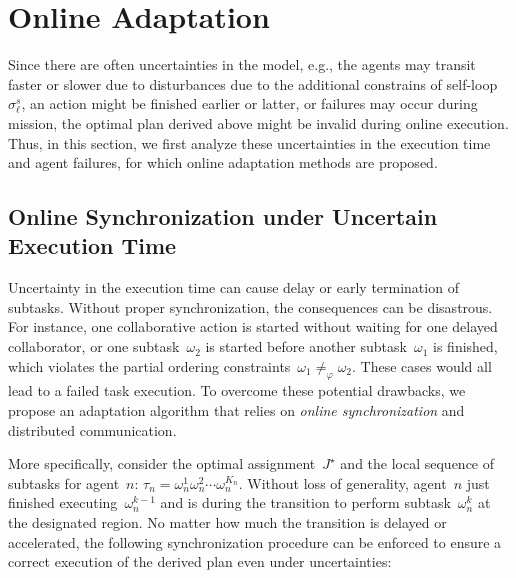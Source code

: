\section{Online Adaptation}
\label{subsec:online-adaptation}

Since there are often uncertainties in the model, e.g., the agents may
transit faster or slower due to disturbances due to the additional constrains of self-loop $\sigma^s_\ell$,
an action might be finished earlier or latter,
or failures may occur during mission,
the optimal plan derived above might be invalid during online execution.
Thus, in this section, we first analyze these uncertainties in the execution time
and agent failures, for which online adaptation methods are proposed.

\subsection{Online Synchronization under Uncertain Execution Time}\label{subsubsec:uncertain}
Uncertainty in the execution time can cause delay or early termination of subtasks.
Without proper synchronization, the consequences can be disastrous.
For instance, one collaborative action is started without waiting for one
delayed collaborator, or one subtask~$\omega_2$ is started before another
subtask~$\omega_1$ is finished, which violates the partial ordering
constraints~$\omega_1\neq_{\varphi} \omega_2$.
These cases would all lead to a failed task execution.
To overcome these potential drawbacks, we propose an adaptation algorithm
that relies on \emph{online synchronization} and distributed communication.

More specifically, consider the optimal assignment~$J^\star$ and the local
sequence of subtasks for agent~$n$: $\tau_n=\omega^1_n\omega^2_n\cdots \omega^{K_n}_n$.
Without loss of generality, agent~$n$ just finished executing~$\omega^{k-1}_n$ and
is during the transition to perform subtask~$\omega^k_n$ at the designated region.
No matter how much the transition is delayed or accelerated,
the following synchronization procedure can be enforced to
ensure a correct execution of the derived plan even under uncertainties:

